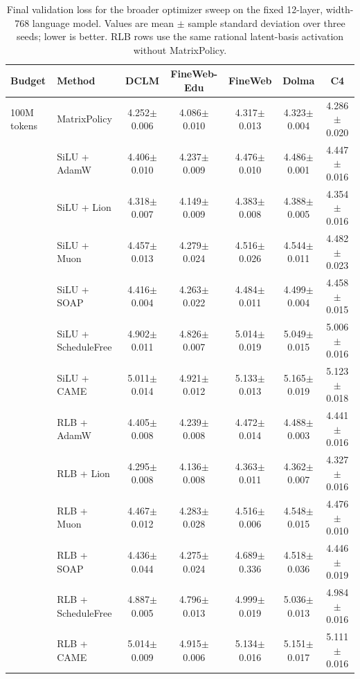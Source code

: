 \begin{table}[H]
\centering
\caption{Final validation loss for the broader optimizer sweep on the fixed 12-layer, width-768 language model. Values are mean $\pm$ sample standard deviation over three seeds; lower is better. RLB rows use the same rational latent-basis activation without MatrixPolicy.}
\label{tab:broad-final-validation}
\begingroup
\scriptsize
\setlength{\tabcolsep}{2.6pt}
\renewcommand{\arraystretch}{0.95}
\begin{tabular*}{\textwidth}{@{\extracolsep{\fill}}llccccc@{}}
\toprule
Budget & Method & DCLM & FineWeb-Edu & FineWeb & Dolma & C4 \\
\midrule
100M tokens & MatrixPolicy & 4.252$\pm$0.006 & 4.086$\pm$0.010 & 4.317$\pm$0.013 & 4.323$\pm$0.004 & 4.286$\pm$0.020 \\
 & SiLU + AdamW & 4.406$\pm$0.010 & 4.237$\pm$0.009 & 4.476$\pm$0.010 & 4.486$\pm$0.001 & 4.447$\pm$0.016 \\
 & SiLU + Lion & 4.318$\pm$0.007 & 4.149$\pm$0.009 & 4.383$\pm$0.008 & 4.388$\pm$0.005 & 4.354$\pm$0.016 \\
 & SiLU + Muon & 4.457$\pm$0.013 & 4.279$\pm$0.024 & 4.516$\pm$0.026 & 4.544$\pm$0.011 & 4.482$\pm$0.023 \\
 & SiLU + SOAP & 4.416$\pm$0.004 & 4.263$\pm$0.022 & 4.484$\pm$0.011 & 4.499$\pm$0.004 & 4.458$\pm$0.015 \\
 & SiLU + ScheduleFree & 4.902$\pm$0.011 & 4.826$\pm$0.007 & 5.014$\pm$0.019 & 5.049$\pm$0.015 & 5.006$\pm$0.016 \\
 & SiLU + CAME & 5.011$\pm$0.014 & 4.921$\pm$0.012 & 5.133$\pm$0.013 & 5.165$\pm$0.019 & 5.123$\pm$0.018 \\
 & RLB + AdamW & 4.405$\pm$0.008 & 4.239$\pm$0.008 & 4.472$\pm$0.014 & 4.488$\pm$0.003 & 4.441$\pm$0.016 \\
 & RLB + Lion & 4.295$\pm$0.008 & 4.136$\pm$0.008 & 4.363$\pm$0.011 & 4.362$\pm$0.007 & 4.327$\pm$0.016 \\
 & RLB + Muon & 4.467$\pm$0.012 & 4.283$\pm$0.028 & 4.516$\pm$0.006 & 4.548$\pm$0.015 & 4.476$\pm$0.010 \\
 & RLB + SOAP & 4.436$\pm$0.044 & 4.275$\pm$0.024 & 4.689$\pm$0.336 & 4.518$\pm$0.036 & 4.446$\pm$0.019 \\
 & RLB + ScheduleFree & 4.887$\pm$0.005 & 4.796$\pm$0.013 & 4.999$\pm$0.019 & 5.036$\pm$0.013 & 4.984$\pm$0.016 \\
 & RLB + CAME & 5.014$\pm$0.009 & 4.915$\pm$0.006 & 5.134$\pm$0.016 & 5.151$\pm$0.017 & 5.111$\pm$0.016 \\

\end{tabular*}
\end{table}

